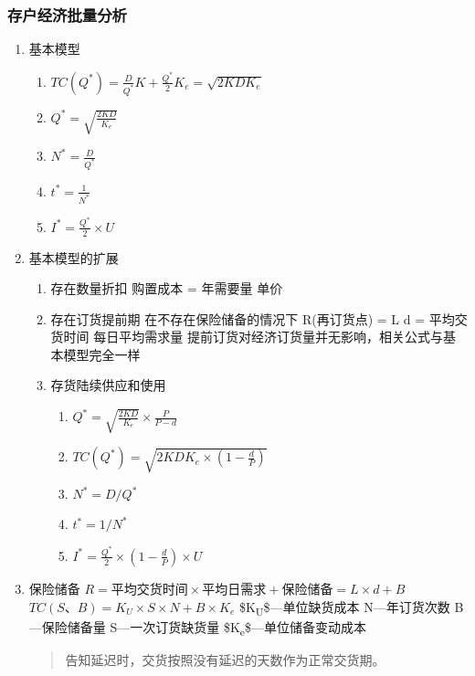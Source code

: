 \documentclass[11pt]{article}
\begin{document}
\subsubsection{存户经济批量分析}
\label{sec:orgf6e9cc3}
\begin{enumerate}
\item 基本模型
\label{sec:orgd65610a}
\begin{enumerate}
\item \(TC(Q^{*}) = \frac{D}{Q^{*}}K +\frac{Q^{*}}{2}K_{e}=\sqrt{2KDK_{e}}\)
\item \(Q^{*}=\sqrt{\frac{2KD}{K_{e}}}\)
\item \(N^{*}=\frac{D}{Q^{*}}\)
\item \(t^{*}=\frac{1}{N^{*}}\)
\item \(I^{*}=\frac{Q^{*}}{2}\times U\)
\end{enumerate}
\item 基本模型的扩展
\label{sec:org16afe39}
\begin{enumerate}
\item 存在数量折扣
\label{sec:orgfe33b69}
购置成本 = 年需要量 \texttimes{} 单价
\item 存在订货提前期
\label{sec:orgb79c27e}
在不存在保险储备的情况下
R(再订货点) = L \texttimes{} d = 平均交货时间 \texttimes{} 每日平均需求量
提前订货对经济订货量并无影响，相关公式与基本模型完全一样
\item 存货陆续供应和使用
\label{sec:orgfbe9dd4}
\begin{enumerate}
\item \(Q^{*}=\sqrt{\frac{2KD}{K_{e}}}\times \frac{P}{P-d}\)
\item \(TC(Q^{*})=\sqrt{2KDK_{e}\times (1-\frac{d}{P})}\)
\item \(N^{*}=D/Q^{*}\)
\item \(t^{*}=1/N^{*}\)
\item \(I^{*}=\frac{Q^{*}}{2}\times (1-\frac{d}{P})\times U\)
\end{enumerate}
\end{enumerate}
\item 保险储备
\label{sec:org6ac025c}
\(R=平均交货时间\times 平均日需求 + 保险储备=L\times d +B\)
\(TC(S、B)=K_{U}\times S\times N+B\times K_{e}\)
\$K\textsubscript{U}\$---单位缺货成本
N---年订货次数
B---保险储备量
S---一次订货缺货量
\$K\textsubscript{e}\$---单位储备变动成本
\begin{quote}
告知延迟时，交货按照没有延迟的天数作为正常交货期。
\end{quote}
\end{enumerate}
\end{document}
